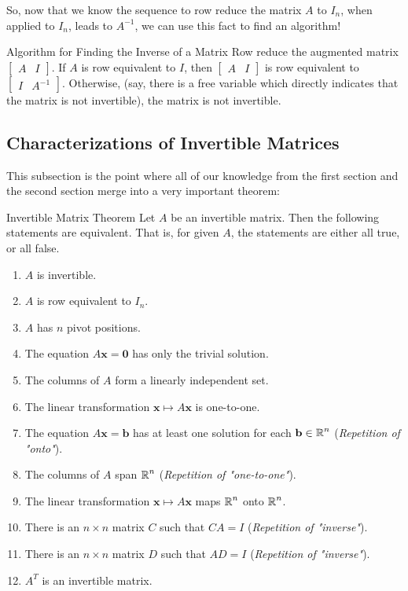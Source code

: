 \documentclass{article}
\begin{document}
So, now that we know the sequence to row reduce the matrix $A$ to $I_n$, when applied to $I_n$, leads to $A^{-1}$, we can use this fact to find an algorithm!

\begin{boxcontainer}{Algorithm for Finding the Inverse of a Matrix}
	Row reduce the augmented matrix $\begin{bmatrix} A & I \end{bmatrix}$. If $A$ is row equivalent to $I$, then $\begin{bmatrix} A & I \end{bmatrix}$ is row equivalent to $\begin{bmatrix} I & A^{-1} \end{bmatrix}$. Otherwise, (say, there is a free variable which directly indicates that the matrix is not invertible), the matrix is not invertible.
\end{boxcontainer}

\subsection{Characterizations of Invertible Matrices}
This subsection is the point where all of our knowledge from the first section and the second section merge into a very important theorem:

\begin{theorem}{Invertible Matrix Theorem}
	Let $A$ be an invertible matrix. Then the following statements are equivalent. That is, for given $A$, the statements are either all true, or all false.
	\begin{enumerate}[label=\alph*)]
		\item
		      $A$ is invertible.
		\item
		      $A$ is row equivalent to $I_n$.
		\item
		      $A$ has $n$ pivot positions.
		\item
		      The equation $A\mathbf{x} = \mathbf{0}$ has only the trivial solution.
		\item
		      The columns of $A$ form a linearly independent set.
		\item
		      The linear transformation $\mathbf{x} \mapsto A\mathbf{x}$ is one-to-one.
		\item
		      The equation $A\mathbf{x} = \mathbf{b}$ has at least one solution for each $\mathbf{b} \in \operatorname{\mathbb{R}}^n$ (\emph{Repetition of "onto"}).
		\item
		      The columns of $A$ span $\operatorname{\mathbb{R}}^n$ (\emph{Repetition of "one-to-one"}).
		\item
		      The linear transformation $\mathbf{x} \mapsto A\mathbf{x}$ maps $\operatorname{\mathbb{R}}^n$ onto $\operatorname{\mathbb{R}}^n$.
		\item
		      There is an $n \times n$ matrix $C$ such that $CA = I$ (\emph{Repetition of "inverse"}).
		\item
		      There is an $n \times n$ matrix $D$ such that $AD = I$ (\emph{Repetition of "inverse"}).
		\item
		      $A^T$ is an invertible matrix.
	\end{enumerate}
\end{theorem}
\end{document}
